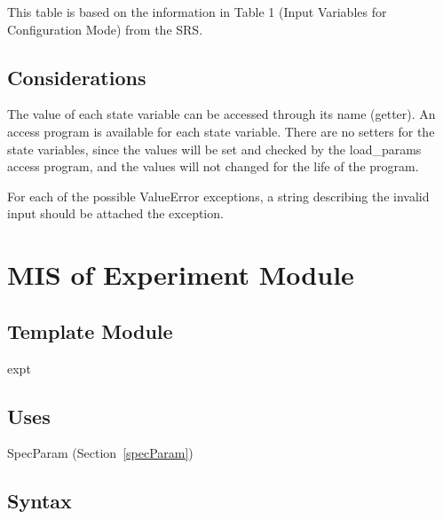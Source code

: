 \documentclass[12pt, titlepage]{article}
\begin{document}
\noindent This table is based on the information in Table 1 (Input Variables for
Configuration Mode) from the SRS.

\subsection{Considerations}

The value of each state variable can be accessed through its name (getter).  An
access program is available for each state variable.  There are no setters for
the state variables, since the values will be set and checked by the
load\_params access program, and the values will not changed for the life of the
program.

For each of the possible ValueError exceptions, a string describing the invalid input
should be attached the exception.

\newpage

\section{MIS of Experiment Module } \label{expt}

\subsection{Template Module}

expt

\subsection{Uses}

SpecParam (Section~\ref{specParam})

\subsection{Syntax}
\end{document}
